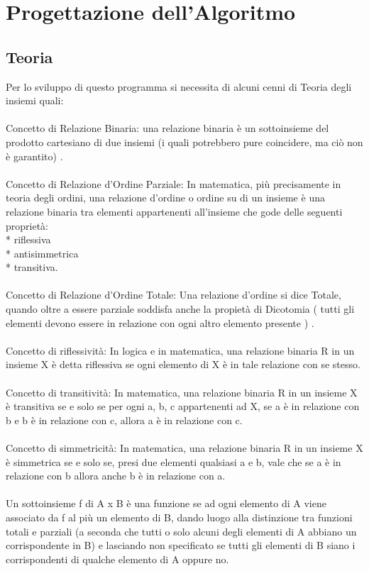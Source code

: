 \documentclass[11pt, a4paper, titlepage, block]{article}
\begin{document}
	
	
	\newpage                        
\section{Progettazione dell'Algoritmo}
\subsection{Teoria}
Per lo sviluppo di questo programma si necessita di alcuni cenni di Teoria degli insiemi quali:\\
\\
Concetto di Relazione Binaria:  una relazione binaria \`e un sottoinsieme del prodotto
cartesiano di due insiemi  (i quali potrebbero pure coincidere,
ma ci\`o non \`e garantito) .\\
\\
Concetto di Relazione d'Ordine Parziale: In matematica, pi\`u precisamente in teoria degli ordini, una relazione d'ordine o ordine su di un insieme \`e una relazione binaria tra elementi appartenenti all'insieme che gode delle seguenti propriet\`a:\\
* riflessiva\\
* antisimmetrica\\
* transitiva.\\
\\
Concetto di Relazione d'Ordine Totale: Una relazione d'ordine si dice Totale, quando oltre a essere parziale soddisfa anche la propiet\`a di Dicotomia  ( tutti gli elementi devono essere in relazione con ogni altro elemento presente ) .\\
\\
Concetto di riflessivit\`a:  In logica e in matematica, una relazione binaria R in un insieme X \`e detta riflessiva se ogni elemento di X \`e in tale relazione con se stesso. \\
\\
Concetto di transitivit\`a: In matematica, una relazione binaria R in un insieme X \`e transitiva se e solo se per ogni a, b, c appartenenti ad X, se a \`e in relazione con b e b \`e in relazione con c, allora a \`e in relazione con c. \\
\\
Concetto di simmetricit\`a: In matematica, una relazione binaria R in un insieme X \`e simmetrica se e solo se, presi due elementi qualsiasi a e b, vale che se a \`e in relazione con b allora anche b \`e in relazione con a.\\
\\
Un sottoinsieme f di A x B \`e una funzione se ad ogni
elemento di A viene associato da f al pi\`u un elemento di B,
dando luogo alla distinzione tra funzioni totali e parziali
 (a seconda che tutti o solo alcuni degli elementi di A
abbiano un corrispondente in B)  e lasciando non specificato
se tutti gli elementi di B siano i corrispondenti di
qualche elemento di A oppure no.\\
\newpage
\end{document}
